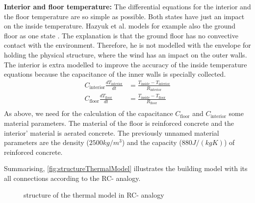     \textbf{Interior and floor temperature:}\newline
    The differential equations for the interior and the floor temperature are so simple as possible. Both states have just an impact on the inside temperature. 
    Hazyuk et al. models for example also the ground floor as one state \cite{Hazyuk.2012}. The explanation is that the ground floor has no convective contact with the environment. Therefore, he is not modelled with the envelope for holding the physical structure, where the wind has an impact on the outer walls.
    The interior is extra modelled to improve the accuracy of the inside temperature equations because the capacitance of the inner walls is specially collected.
    \begin{align}
    C_\text{interior} \frac{d T_\text{interior}}{d t} &= \frac{T_\text{inside}-T_\text{interior}}{R_\text{interior}} \\
       C_\text{floor} \frac{d T_\text{floor}}{d t} &= \frac{T_\text{inside}-T_\text{floor}}{R_\text{floor}} \nonumber\\
    \end{align}
    As above, we need for the calculation of the capacitance $C_\text{floor}$ and $C_\text{interior}$ some material parameters. The material of the floor is reinforced concrete and the interior' material is aerated concrete. The previously unnamed material parameters are the density ($2500 kg/m^3$) \cite{AntonSchweizer.12.10.2021} and the capacity ($880 J/(kg K)$) \cite{AntonSchweizer.12.10.2021b} of reinforced concrete.\newline
     
    Summarising, \autoref{fig:structureThermalModel} illustrates the building model with its all connections according to the RC- analogy.
    \begin{figure}
            \centering
            \def\svgwidth{320pt}
            
            \caption{structure of the thermal model in RC- analogy}
            \label{fig:structureThermalModel}
        \end{figure}
        
